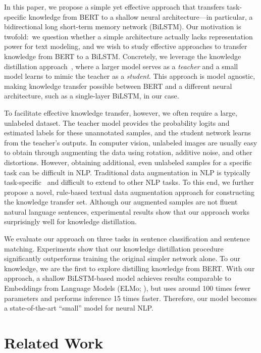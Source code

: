 \documentclass[11pt,a4paper]{article}
\begin{document}
 In this paper, we propose a simple yet effective approach that transfers task-specific knowledge from BERT to a shallow neural architecture---in particular, a bidirectional long short-term memory network (BiLSTM). 
 Our motivation is twofold:~we question whether a simple architecture actually lacks representation power for text modeling, and we wish to study effective approaches to transfer knowledge from BERT to a BiLSTM.
 Concretely, we leverage the knowledge distillation approach~\cite{ba2014deep, hinton2015distilling}, where a larger model serves as a \textit{teacher} and a small model learns to mimic the teacher as a \textit{student}. 
 This approach is model agnostic, making knowledge transfer possible between BERT and a different neural architecture, such as a single-layer BiLSTM, in our case. 
 
 To facilitate effective knowledge transfer, however, we often require a large, unlabeled dataset. The teacher model provides the probability logits and estimated labels for these unannotated samples, and the student network learns from the teacher's outputs.
 In computer vision, unlabeled images are usually easy to obtain through augmenting the data using rotation, additive noise, and other distortions.
 However, obtaining additional, even unlabeled samples for a specific task can be difficult in NLP.
 Traditional data augmentation in NLP is typically task-specific~\cite{wang2016galactic, serban2016generating} and difficult to extend to other NLP tasks. 
 To this end, we further propose a novel, rule-based textual data augmentation approach for constructing the knowledge transfer set.
Although our augmented samples are not fluent natural language sentences, experimental results show that our approach works surprisingly well for knowledge distillation.
 


We evaluate our approach on three tasks in sentence classification and sentence matching. Experiments show that our knowledge distillation procedure significantly outperforms training the original simpler network alone.
To our knowledge, we are the first to explore distilling knowledge from BERT. 
With our approach, a shallow BiLSTM-based model achieves results comparable to Embeddings from Language Models (ELMo; \citealp{peters2018deep}), but uses around 100 times fewer parameters and performs inference 15 times faster.
Therefore, our model becomes a state-of-the-art ``small'' model for neural NLP.



\section{Related Work}
\end{document}
